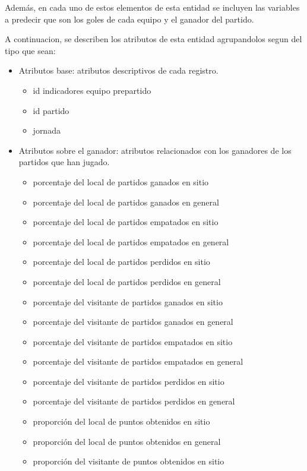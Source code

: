 Además, en cada uno de estos elementos de esta entidad se incluyen las variables a predecir que 
son los goles de cada equipo y el ganador del partido.

A continuacion, se describen los atributos de esta entidad agrupandolos segun del tipo que sean:

\begin{itemize}
    \item Atributos base: atributos descriptivos de cada registro.
    \begin{itemize}
        \item id indicadores equipo prepartido
        \item id partido
        \item jornada
    \end{itemize}
    \item Atributos sobre el ganador: atributos relacionados con los ganadores de los partidos que han jugado.
    \begin{itemize}
        \item porcentaje del local de partidos ganados en sitio
        \item porcentaje del local de partidos ganados en general
        \item porcentaje del local de partidos empatados en sitio
        \item porcentaje del local de partidos empatados en general
        \item porcentaje del local de partidos perdidos en sitio
        \item porcentaje del local de partidos perdidos en general
        \item porcentaje del visitante de partidos ganados en sitio
        \item porcentaje del visitante de partidos ganados en general
        \item porcentaje del visitante de partidos empatados en sitio
        \item porcentaje del visitante de partidos empatados en general
        \item porcentaje del visitante de partidos perdidos en sitio
        \item porcentaje del visitante de partidos perdidos en general
        \item proporción del local de puntos obtenidos en sitio
        \item proporción del local de puntos obtenidos en general
        \item proporción del visitante de puntos obtenidos en sitio

\end{itemize}
\end{itemize}
